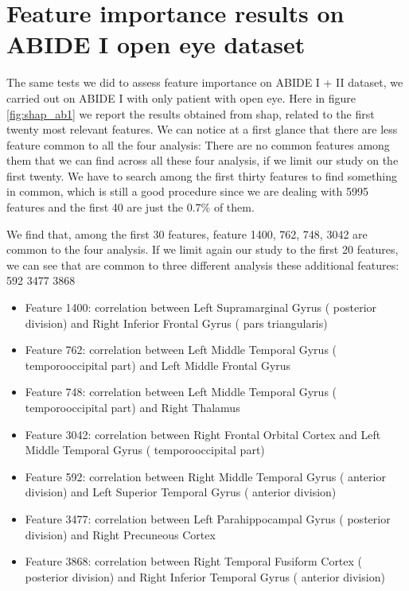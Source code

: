 \documentclass[10pt]{report}
\begin{document}
\section{Feature importance results on ABIDE I open eye dataset}

The same tests we did to assess feature importance on ABIDE I + II dataset, we carried out on ABIDE I with only patient with open eye.
Here in figure \ref{fig:shap_ab1} we report the results obtained from shap, related to the first twenty most relevant features.
We can notice at a first glance that there are less feature common to all the four analysis:
There are no common features among them that we can find across all these four analysis, if we limit our study on the first twenty.
We have to search among the first thirty features to find something in common, which is still a good procedure since we are dealing with 5995 features and the first 40 are just the 0.7\% of them.

We find that, among the first 30 features, feature 1400, 762, 748, 3042 are common to the four analysis.
If we limit again our study to the first 20 features, we can see that are common to three different analysis these additional features: 592 3477 3868




\begin{itemize}
\item Feature 1400: correlation between Left Supramarginal Gyrus ( posterior division) and Right Inferior Frontal Gyrus ( pars triangularis)
\item Feature 762: correlation between Left Middle Temporal Gyrus ( temporooccipital part) and Left Middle Frontal Gyrus
\item Feature 748: correlation between Left Middle Temporal Gyrus ( temporooccipital part) and Right Thalamus
\item Feature 3042: correlation between Right Frontal Orbital Cortex  and Left Middle Temporal Gyrus ( temporooccipital part)

\item Feature 592: correlation between Right Middle Temporal Gyrus ( anterior division) and Left Superior Temporal Gyrus ( anterior division)
\item Feature 3477: correlation between Left Parahippocampal Gyrus ( posterior division) and Right Precuneous Cortex
\item Feature 3868: correlation between Right Temporal Fusiform Cortex ( posterior division) and Right Inferior Temporal Gyrus ( anterior division)

\end{itemize}
\end{document}
